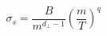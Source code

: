 \begin{equation}
\sigma_s = \frac{B}{m^{d_\perp-1}}\left (\frac{m}{T} \right )^{q}
\label{sigs}
\end{equation}

